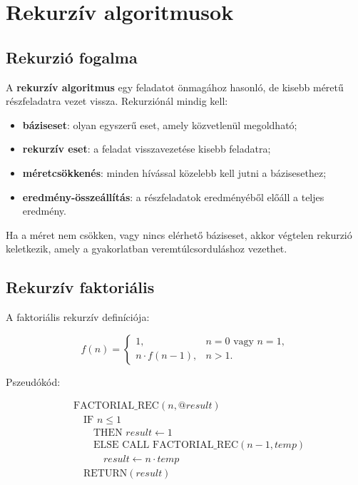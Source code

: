\section{Rekurzív algoritmusok}

\subsection{Rekurzió fogalma}

A \textbf{rekurzív algoritmus} egy feladatot önmagához hasonló, de kisebb méretű részfeladatra vezet vissza. Rekurziónál mindig kell:

\begin{itemize}
  \item \textbf{báziseset}: olyan egyszerű eset, amely közvetlenül megoldható;
  \item \textbf{rekurzív eset}: a feladat visszavezetése kisebb feladatra;
  \item \textbf{méretcsökkenés}: minden hívással közelebb kell jutni a bázisesethez;
  \item \textbf{eredmény-összeállítás}: a részfeladatok eredményéből előáll a teljes eredmény.
\end{itemize}

Ha a méret nem csökken, vagy nincs elérhető báziseset, akkor végtelen rekurzió keletkezik, amely a gyakorlatban veremtúlcsorduláshoz vezethet.

\subsection{Rekurzív faktoriális}

A faktoriális rekurzív definíciója:

\[
f(n)=
\begin{cases}
1, & n=0 \text{ vagy } n=1,\\
n\cdot f(n-1), & n>1.
\end{cases}
\]

Pszeudókód:

\[
\begin{aligned}
&\text{FACTORIAL\_REC}(n,@result)\\
&\quad \text{IF } n\leq 1\\
&\quad\quad \text{THEN } result\leftarrow 1\\
&\quad\quad \text{ELSE CALL FACTORIAL\_REC}(n-1,temp)\\
&\quad\quad\quad result\leftarrow n\cdot temp\\
&\quad \text{RETURN}(result)
\end{aligned}
\]

